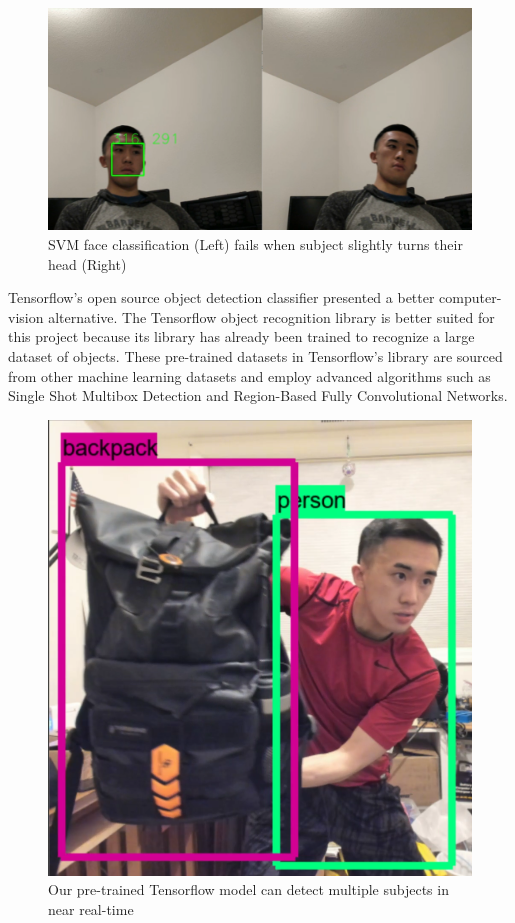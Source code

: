 \documentclass[onecolumn, draftclsnofoot,10pt, compsoc]{IEEEtran}
\makeatletter
\newcommand\captionof[1]{\def\@captype{#1}\caption}
\makeatother
\begin{document}
\begin{singlespace}
			\begin{figure}[H]
			\includegraphics[scale=0.60]{svm.PNG}
			\captionof{figure}{SVM face classification (Left) fails when subject slightly turns their head (Right)}
			\label{svm}
			\end{figure}


			Tensorflow's open source object detection classifier presented a better computer-vision alternative. \cite{tensorflow}
			The Tensorflow object recognition library is better suited for this project because its library has already been trained to recognize a large dataset of objects. \cite{convolutional_object_detectors}
			These pre-trained datasets in Tensorflow's library are sourced from other machine learning datasets and employ advanced algorithms such as Single Shot Multibox Detection and Region-Based Fully Convolutional Networks. \cite{coco} \cite{open_images} \cite{kitti}


			\begin{figure}[H]
			\includegraphics[scale=0.45]{tensorflow.PNG}
			\captionof{figure}{Our pre-trained Tensorflow model can  detect multiple subjects in near real-time}
			\label{tf-detect}
			\end{figure}



\end{singlespace}
\end{document}
